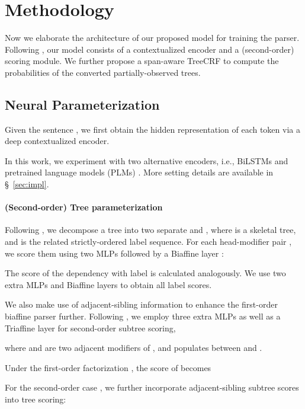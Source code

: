 \documentclass[11pt]{article}
\begin{document}
\section{Methodology}\label{sec:methodology}

Now we elaborate the architecture of our proposed model for training the parser.
Following \citet{dozat-etal-2017-biaffine,zhang-etal-2020-efficient}, our model consists of a contextualized encoder and a (second-order) scoring module.
We further propose a span-aware TreeCRF to compute the probabilities of the converted partially-observed trees.

\subsection{Neural Parameterization}
Given the sentence , we first obtain the hidden representation of each token  via a deep contextualized encoder.

In this work, we experiment with two alternative encoders, i.e., BiLSTMs \cite{yarin-etal-2016-dropout} and pretrained language models (PLMs) \cite{devlin-etal-2019-bert}.
More setting details are available in \S~\ref{sec:impl}.


\paragraph{(Second-order) Tree parameterization}
Following \citet{dozat-etal-2017-biaffine}, we decompose a tree  into two separate  and , where  is a skeletal tree, and  is the related strictly-ordered label sequence.
For each head-modifier pair , we score them using two MLPs followed by a Biaffine layer \cite{cai-etal-2018-full}:

The score of the dependency  with label  is calculated analogously.
We use two extra MLPs and  Biaffine layers to obtain all label scores.

We also make use of adjacent-sibling information \cite{mcdonald-pereira-2006-online} to enhance the first-order biaffine parser further.
Following \citet{wang-etal-2019-second,zhang-etal-2020-efficient}, we employ three extra MLPs as well as a Triaffine layer for second-order subtree scoring,

where  and  are two adjacent modifiers of , and  populates between  and .

Under the first-order factorization \cite{mcdonald-etal-2005-online}, the score of  becomes

For the second-order case \cite{mcdonald-pereira-2006-online}, we further incorporate adjacent-sibling subtree scores into tree scoring:
\end{document}
